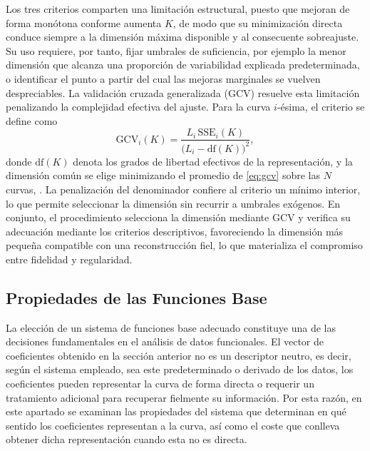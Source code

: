 Los tres criterios comparten una limitación estructural, puesto que mejoran de forma monótona conforme aumenta $K$, de modo que su minimización directa conduce siempre a la dimensión máxima disponible y al consecuente sobreajuste. Su uso requiere, por tanto, fijar umbrales de suficiencia, por ejemplo la menor dimensión que alcanza una proporción de variabilidad explicada predeterminada, o identificar el punto a partir del cual las mejoras marginales se vuelven despreciables. La validación cruzada generalizada (GCV) resuelve esta limitación penalizando la complejidad efectiva del ajuste. Para la curva $i$-ésima, el criterio se define como
\begin{equation}\label{eq:gcv}
    \mathrm{GCV}_i(K) = \frac{L_i\,\mathrm{SSE}_i(K)}
    {\bigl(L_i - \mathrm{df}(K)\bigr)^{2}},
\end{equation}
donde $\mathrm{df}(K)$ denota los grados de libertad efectivos de la representación, y la dimensión común se elige minimizando el promedio de \eqref{eq:gcv} sobre las $N$ curvas, \cite{02_01_ramsay2006functional}. La penalización del denominador confiere al criterio un mínimo interior, lo que permite seleccionar la dimensión sin recurrir a umbrales exógenos. En conjunto, el procedimiento selecciona la dimensión mediante GCV y verifica su adecuación mediante los criterios descriptivos, favoreciendo la dimensión más pequeña compatible con una reconstrucción fiel, lo que materializa el compromiso entre fidelidad y regularidad.

\subsection{Propiedades de las Funciones Base}
\label{02_01_02_propiedades_funciones_base}
La elección de un sistema de funciones base adecuado constituye una de las decisiones fundamentales en el análisis de datos funcionales. El vector de coeficientes obtenido en la sección anterior no es un descriptor neutro, es decir, según el sistema empleado, sea este predeterminado o derivado de los datos, los coeficientes pueden representar la curva de forma directa o requerir un tratamiento adicional para recuperar fielmente su información. Por esta razón, en este apartado se examinan las propiedades del sistema que determinan en qué sentido los coeficientes representan a la curva, así como el coste que conlleva obtener dicha representación cuando esta no es directa.

